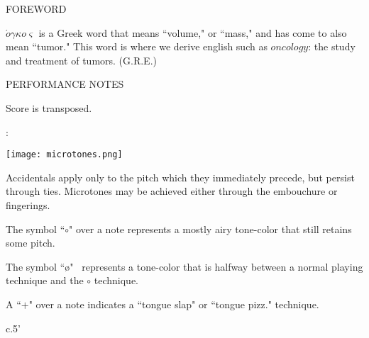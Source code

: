 \documentclass[10pt]{article}
\begin{document}
\begin{center}
\huge FOREWORD
\end{center}

\begingroup
\begin{center}
\hspace{10mm} $\acute{o} \gamma \kappa o \varsigma$ is a Greek word that means ``volume," or ``mass," and has come to also mean ``tumor." This word is where we derive english such as $oncology$: the study and treatment of tumors. 
\rightskip\leftskip
\phantom{text} \hfill (G.R.E.)
\end{center}
\endgroup

\vspace*{1.5\baselineskip}
  
\vspace*{1\baselineskip}

\begin{center}
\huge PERFORMANCE NOTES
\end{center}

\begin{center}
Score is transposed.
\end{center}

\begin{center}
:
\end{center}

\begin{center}
\texttt{[image: microtones.png]}
\end{center}

\begin{center}
Accidentals apply only to the pitch which they immediately precede, but persist through ties. Microtones may be achieved either through the embouchure or fingerings.
\end{center}

\begin{center}
The symbol ``$\circ$" over a note represents a mostly airy tone-color that still retains some pitch.
\end{center}

\begin{center}
The symbol ``\o" \ represents a tone-color that is halfway between a normal playing technique and the $\circ$ technique.
\end{center}

\begin{center}
A ``$+$" over a note indicates a ``tongue slap" or ``tongue pizz." technique.
\end{center}


\vspace*{1\baselineskip}

\begin{center}
c.5'
\end{center}
\end{document}

